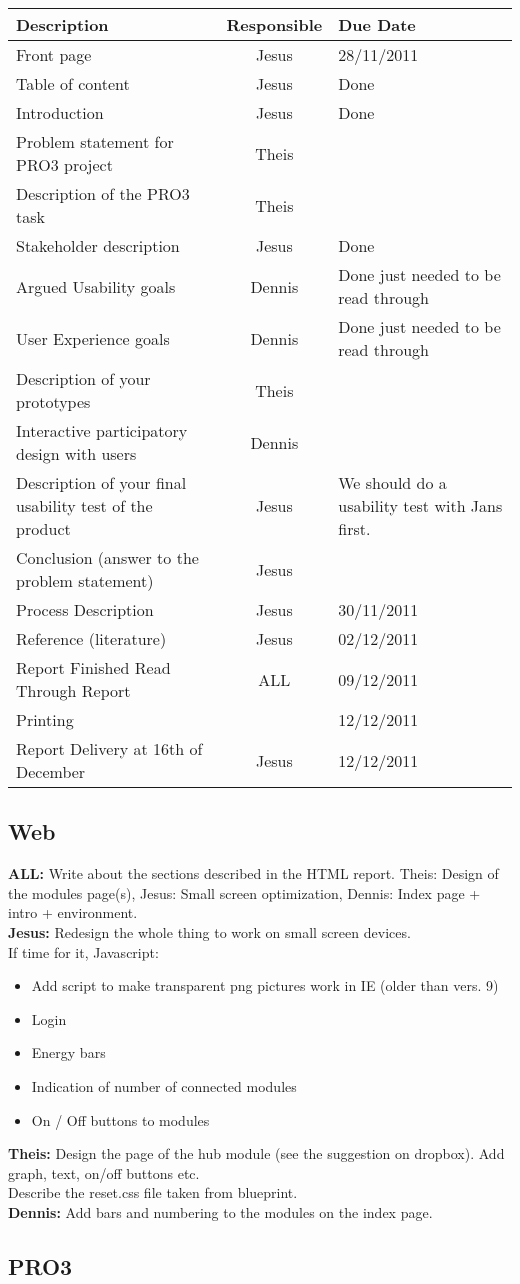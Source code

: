 \documentclass[10pt,a4paper]{article}
\begin{document}
\begin{tabular}{ | p{8cm} | c | p{5cm} |}
\hline
Description & Responsible & Due Date \\ \hline
Front page & Jesus & 28/11/2011\\ \hline
Table of content & Jesus & Done \\ \hline
Introduction & Jesus & Done\\ \hline
Problem statement for PRO3 project & Theis & \\ \hline
Description of the PRO3 task & Theis & \\ \hline
Stakeholder description & Jesus  & Done\\ \hline
Argued Usability goals & Dennis & Done just needed to be read through\\ \hline
User Experience goals &  Dennis  & Done just needed to be read through\\ \hline
Description of your prototypes & Theis & \\ \hline
Interactive participatory design with users & Dennis  & \\ \hline
Description of your final usability test of the product & Jesus & We should do a usability test with Jans first. \\ \hline
Conclusion (answer to the problem statement) & Jesus  & \\ \hline
Process Description & Jesus & 30/11/2011\\ \hline
Reference (literature) & Jesus  &  02/12/2011\\ \hline
Report Finished Read Through Report & ALL & 09/12/2011\\ \hline
Printing &  & 12/12/2011\\ \hline
Report Delivery at 16th of December & Jesus & 12/12/2011 \\ \hline
\hline
\end{tabular}

\subsection{Web}
\textbf{ALL:} Write about the sections described in the HTML report. Theis: Design of the modules page(s), Jesus: Small screen optimization, Dennis: Index page + intro + environment.
\\ \textbf{Jesus:} Redesign the whole thing to work on small screen devices.
\\If time for it, Javascript: 
\begin{itemize}
	\item Add script to make transparent png pictures work in IE (older than vers. 9)
	\item Login
	\item Energy bars
	\item Indication of number of connected modules
	\item On / Off buttons to modules
\end{itemize}
\textbf{Theis:}
Design the page of the hub module (see the suggestion on dropbox). Add graph, text, on/off buttons etc.
\\Describe the reset.css file taken from blueprint.
\\\textbf{Dennis:}
Add bars and numbering to the modules on the index page.
\subsection{PRO3}
\end{document}
